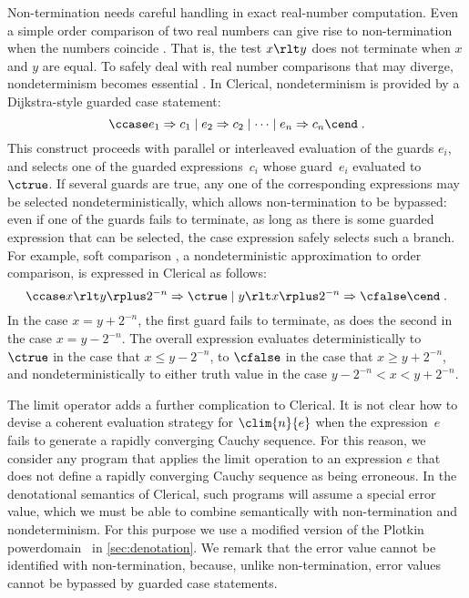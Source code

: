 Non-termination needs careful handling in exact real-number computation. 
Even a simple order comparison of two real numbers can give rise to non-termination when the numbers coincide \cite[Theorem 4.1.16]{w00}. 
That is, the test $x \rlt y$ does not terminate when $x$ and $y$ are equal.
To safely deal with real number comparisons that may diverge, nondeterminism becomes essential \cite{LUCKHARDT1977321}. 
In Clerical, nondeterminism is provided by a Dijkstra-style guarded case statement:
\[\ccase e_1  \Rightarrow c_1 \mid e_2 \Rightarrow c_2 \mid \cdots \mid e_n \Rightarrow c_n \cend\;.\]
This construct proceeds with parallel or interleaved evaluation of the guards $e_i$,
and selects one of the guarded expressions~$c_i$ whose guard~$e_i$ evaluated to~$\ctrue$.
If several guards are true, any one of the corresponding expressions may be selected nondeterministically,
which allows non-termination to be bypassed: even if one of the guards fails to terminate,
as long as there is some guarded expression that can be selected, the case expression safely selects such a branch.
For example, soft comparison \cite{BRATTKA1998490}, a nondeterministic approximation to 
order comparison, is expressed in Clerical as follows:
\[
\ccase x \rlt y \rplus 2^{-n}  \Rightarrow \ctrue \mid y \rlt x \rplus 2^{-n} \Rightarrow \cfalse \cend\;.
\]
In the case $x = y + 2^{-n}$, the first guard fails to terminate, as does the second in the case $x = y - 2^{-n}$.
The overall expression evaluates deterministically to $\ctrue$ in the case that $x \leq  y - 2^{-n}$, to 
$\cfalse$ in the case that $x \geq  y + 2^{-n}$, and nondeterministically to either truth value in the case
$y - 2^{-n} < x < y + 2^{-n}$.

The limit operator adds a further complication to Clerical.
%
It is not clear how to devise a coherent evaluation strategy for $\clim{n}{e}$ when the expression~$e$ fails to generate a rapidly converging Cauchy sequence.
%
For this reason, we consider any program that applies the limit operation to an expression $e$ that does not define a rapidly converging Cauchy sequence as being erroneous.
%
In the denotational semantics of Clerical, such programs will assume a special error value, which we must be able to combine semantically with non-termination and nondeterminism. For this purpose we 
use  
a modified version of the Plotkin powerdomain~\cite{plotkin1976powerdomain} in \cref{sec:denotation}.
%
We remark that the error value cannot be identified with non-termination, because, unlike non-termination, error values cannot be bypassed by guarded case statements.



